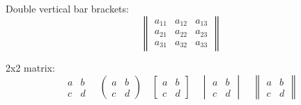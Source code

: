 \documentclass[10pt]{article}
\begin{document}
Double vertical bar brackets:
\begin{equation*}
	\begin{Vmatrix}
		a_{11} & a_{12} & a_{13} \\
		a_{21} & a_{22} & a_{23} \\
		a_{31} & a_{32} & a_{33}
	\end{Vmatrix}
\end{equation*}

2x2 matrix:
\begin{equation*}
\begin{matrix}
a & b \\
c & d
\end{matrix}
\quad
\begin{pmatrix}
a & b \\
c & d
\end{pmatrix}
\quad
\begin{bmatrix}
a & b \\
c & d
\end{bmatrix}
\quad
\begin{vmatrix}
a & b \\
c & d
\end{vmatrix}
\quad
\begin{Vmatrix}
a & b \\
c & d
\end{Vmatrix}
\end{equation*}
\end{document}
